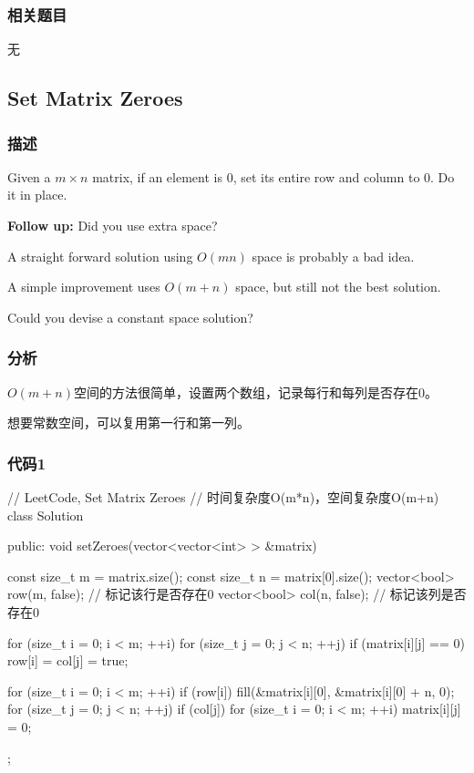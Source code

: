 \subsubsection{相关题目}
\begindot
\item 无
\myenddot


\subsection{Set Matrix Zeroes} %
\label{sec:set-matrix-zeroes}


\subsubsection{描述}
Given a $m \times n$ matrix, if an element is 0, set its entire row and column to 0. Do it in place.

\textbf{Follow up:}
Did you use extra space?

A straight forward solution using $O(mn)$ space is probably a bad idea.

A simple improvement uses $O(m + n)$ space, but still not the best solution.

Could you devise a constant space solution?


\subsubsection{分析}
$O(m+n)$空间的方法很简单，设置两个数组，记录每行和每列是否存在0。

想要常数空间，可以复用第一行和第一列。


\subsubsection{代码1}
\begin{Code}
// LeetCode, Set Matrix Zeroes
// 时间复杂度O(m*n)，空间复杂度O(m+n)
class Solution {
public:
    void setZeroes(vector<vector<int> > &matrix) {
        const size_t m = matrix.size();
        const size_t n = matrix[0].size();
        vector<bool> row(m, false); // 标记该行是否存在0
        vector<bool> col(n, false); // 标记该列是否存在0

        for (size_t i = 0; i < m; ++i) {
            for (size_t j = 0; j < n; ++j) {
                if (matrix[i][j] == 0) {
                    row[i] = col[j] = true;
                }
            }
        }

        for (size_t i = 0; i < m; ++i) {
            if (row[i])
                fill(&matrix[i][0], &matrix[i][0] + n, 0);
        }
        for (size_t j = 0; j < n; ++j) {
            if (col[j]) {
                for (size_t i = 0; i < m; ++i) {
                    matrix[i][j] = 0;
                }
            }
        }
    }
};
\end{Code}


